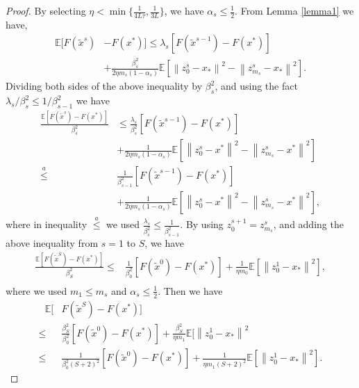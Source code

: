 \documentclass[letterpaper]{article} %
\newcommand*{\E}{\mathbb{E}}
\newcommand{\norm}[1]{\left\lVert#1\right\rVert}
\begin{document}
\begin{proof}
By selecting $\eta < \min\{\frac{1}{4L
\tau}, \frac{1}{3L}\}$, we have $\alpha_s\leq \frac{1}{2}$. From Lemma \ref{lemma1} we have,
\begin{equation}
\begin{split}
\E[F(\widetilde{x}^s)&-F(x^*)]\leq  \lambda_s[F({\widetilde x}^{s-1})-F(x^*)]\\ 
&+ {\frac{\beta_s^2}{2\eta m_s(1-\alpha_s)}}\E[\norm{z_{0}^s-x_*}^2-\norm{z_{m_s}^s-x_*}^2].
\end{split}
\end{equation}
Dividing both sides of the above inequality by $\beta_s^2$, and using the fact $\lambda_s/\beta_s^2 \leq 1/\beta_{s-1}^2$ we have
\begin{equation*}
\begin{split}
\frac{\E[F(\widetilde{x}^s)-F(x^*)]}{\beta_s^2}&\leq  \frac{\lambda_s}{\beta_s^2}[F(\widetilde{x}^{s-1})-F(x^*)]\\ 
& + {\frac{1 }{2\eta m_s(1-\alpha_s)}}\E[\norm{z_{0}^s-x^*}^2-\norm{z_{m_s}^s-x^*}^2]\\
\stackrel{a}{\leq} & \frac{1}{\beta_{s-1}^2}[F(\widetilde{x}^{s-1})-F(x^*)] \\
&+ {\frac{1}{2\eta m_s(1-\alpha_s)}}\E[\norm{z_{0}^s-x^*}^2-\norm{z_{m_s}^s-x^*}^2], 
\end{split}
\end{equation*}
where in inequality $\stackrel{a}{\leq}$ we used $\frac{\lambda_s}{\beta_s^2}\leq \frac{1}{\beta_{s-1}^2}$. By using $z_0^{s+1} = z_{m_s}^s$, and adding the above inequality from $s=1$ to $S$, we have
\begin{equation*}
\begin{split}
\frac{\E[F(\widetilde{x}^S)-F(x^*)]}{\beta_S^2}\leq & \frac{1}{\beta_{0}^2}[F(\widetilde{x}^{0})-F(x^*)] + {\frac{1}{\eta m_0}}\E\left[\norm{z_{0}^1-x_*}^2\right], \\
\end{split}
\end{equation*}
where we used $m_1\leq m_s$ and $\alpha_s\leq \frac{1}{2}$.
Then we have
\begin{equation*}
\begin{split}
~~~\E[& F(\widetilde{x}^S)-F(x^*)]\\
\leq & \frac{\beta_S^2}{\beta_{0}^2}[F(\widetilde{x}^{0})-F(x^*)]+ {\frac{ \beta_S^2}{\eta m_1}}\E[\norm{z_{0}^1-x_*}^2\\
\leq & \frac{1}{\beta_{0}^2(S+2)^2}[F(\widetilde{x}^{0})-F(x^*)] + {\frac{1 }{\eta m_1(S+2)^2}}\E[\norm{z_{0}^1-x_*}^2].
\end{split}
\end{equation*}


\end{proof}
\end{document}
